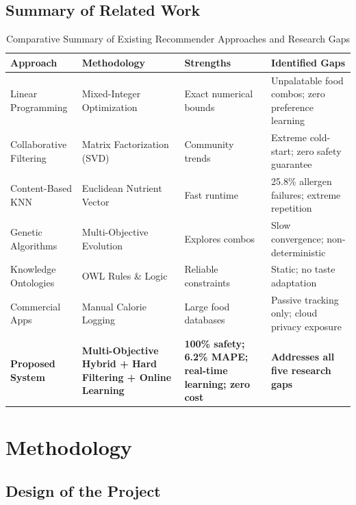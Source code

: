 \documentclass[12pt,a4paper]{report}
\begin{document}
\section{Summary of Related Work}

\begin{table}[htbp]
\centering
\caption{Comparative Summary of Existing Recommender Approaches and Research Gaps}
\label{tab:lit_survey}
\small
\begin{tabularx}{\textwidth}{l X X X}
\toprule
\textbf{Approach} & \textbf{Methodology} & \textbf{Strengths} & \textbf{Identified Gaps} \\
\midrule
Linear Programming & Mixed-Integer Optimization & Exact numerical bounds & Unpalatable food combos; zero preference learning \\
Collaborative Filtering & Matrix Factorization (SVD) & Community trends & Extreme cold-start; zero safety guarantee \\
Content-Based KNN & Euclidean Nutrient Vector & Fast runtime & 25.8\% allergen failures; extreme repetition \\
Genetic Algorithms & Multi-Objective Evolution & Explores combos & Slow convergence; non-deterministic \\
Knowledge Ontologies & OWL Rules \& Logic & Reliable constraints & Static; no taste adaptation \\
Commercial Apps & Manual Calorie Logging & Large food databases & Passive tracking only; cloud privacy exposure \\
\textbf{Proposed System} & \textbf{Multi-Objective Hybrid + Hard Filtering + Online Learning} & \textbf{100\% safety; 6.2\% MAPE; real-time learning; zero cost} & \textbf{Addresses all five research gaps} \\
\bottomrule
\end{tabularx}
\end{table}

\chapter{Methodology}

\section{Design of the Project}
\end{document}
